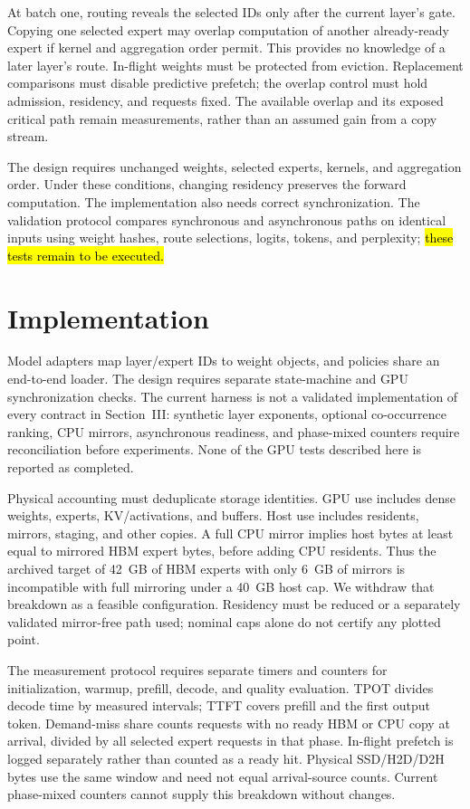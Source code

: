 \documentclass[conference,9pt,letterpaper]{IEEEtran}
\newcommand{\draftnote}[1]{{\sethlcolor{DraftYellow}\hl{#1}}}
\begin{document}
At batch one, routing reveals the selected IDs only after the current layer's gate. Copying one selected expert may overlap computation of another already-ready expert if kernel and aggregation order permit. This provides no knowledge of a later layer's route. In-flight weights must be protected from eviction. Replacement comparisons must disable predictive prefetch; the overlap control must hold admission, residency, and requests fixed. The available overlap and its exposed critical path remain measurements, rather than an assumed gain from a copy stream.

The design requires unchanged weights, selected experts, kernels, and aggregation order. Under these conditions, changing residency preserves the forward computation. The implementation also needs correct synchronization. The validation protocol compares synchronous and asynchronous paths on identical inputs using weight hashes, route selections, logits, tokens, and perplexity; \draftnote{these tests remain to be executed.}

\section{Implementation}
Model adapters map layer/expert IDs to weight objects, and policies share an end-to-end loader. The design requires separate state-machine and GPU synchronization checks. The current harness is not a validated implementation of every contract in Section~III: synthetic layer exponents, optional co-occurrence ranking, CPU mirrors, asynchronous readiness, and phase-mixed counters require reconciliation before experiments. None of the GPU tests described here is reported as completed.

Physical accounting must deduplicate storage identities. GPU use includes dense weights, experts, KV/activations, and buffers. Host use includes residents, mirrors, staging, and other copies. A full CPU mirror implies host bytes at least equal to mirrored HBM expert bytes, before adding CPU residents. Thus the archived target of 42~GB of HBM experts with only 6~GB of mirrors is incompatible with full mirroring under a 40~GB host cap. We withdraw that breakdown as a feasible configuration. Residency must be reduced or a separately validated mirror-free path used; nominal caps alone do not certify any plotted point.

The measurement protocol requires separate timers and counters for initialization, warmup, prefill, decode, and quality evaluation. TPOT divides decode time by measured intervals; TTFT covers prefill and the first output token. Demand-miss share counts requests with no ready HBM or CPU copy at arrival, divided by all selected expert requests in that phase. In-flight prefetch is logged separately rather than counted as a ready hit. Physical SSD/H2D/D2H bytes use the same window and need not equal arrival-source counts. Current phase-mixed counters cannot supply this breakdown without changes.
\end{document}
